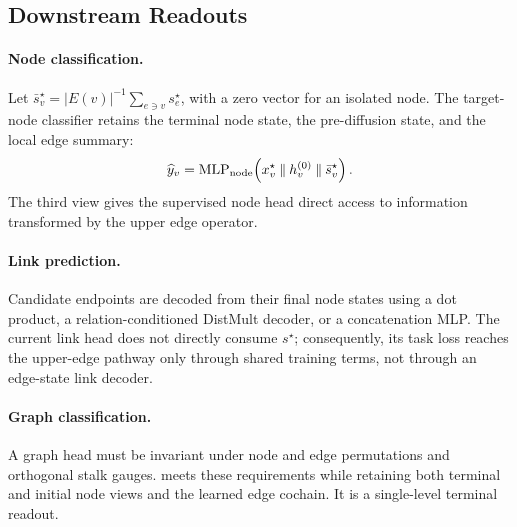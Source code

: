 \subsection{Downstream Readouts}
\label{sec:readouts}

\paragraph{Node classification.}
Let
\(\bar s_v^\star=|E(v)|^{-1}\sum_{e\ni v}s_e^\star\), with a zero vector for an isolated node.
The target-node classifier retains the terminal node state, the pre-diffusion state, and the local
edge summary:
\begin{equation}
  \widehat y_v
  =\operatorname{MLP}_{\mathrm{node}}\!\left(
    x_v^\star\mathbin\Vert h_v^{(0)}\mathbin\Vert\bar s_v^\star
  \right).
  \label{eq:node-readout}
\end{equation}
The third view gives the supervised node head direct access to information transformed by the
upper edge operator.

\paragraph{Link prediction.}
Candidate endpoints are decoded from their final node states using a dot product, a
relation-conditioned DistMult decoder, or a concatenation MLP.  The current link head does not
directly consume \(s^\star\); consequently, its task loss reaches the upper-edge pathway only
through shared training terms, not through an edge-state link decoder.

\paragraph{Graph classification.}
A graph head must be invariant under node and edge permutations and orthogonal stalk gauges.
\sheafconvpool{} meets these requirements while retaining both terminal and initial node views and
the learned edge cochain.  It is a single-level terminal readout.

\subsection{\sheafconvpool{}}

